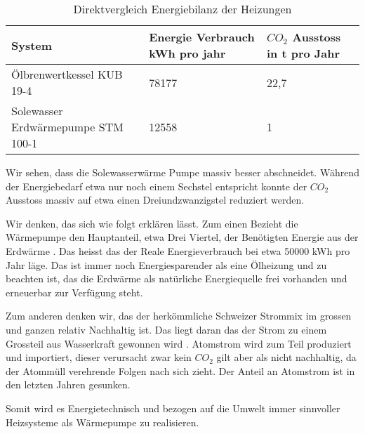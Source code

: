 \begin{table}
\begin{center}
\begin{tabular}{|l|l|l|}

\hline
  System   & Energie Verbrauch kWh pro jahr & $CO_2$ Ausstoss in t pro Jahr\\
\hline
 Ölbrenwertkessel KUB 19-4           & 78177 & 22,7 \\
\hline
 Solewasser Erdwärmepumpe STM 100-1  & 12558 & 1     \\
\hline
\end{tabular}
\end{center}
\label{bilanz:vergleich}
\caption{Direktvergleich Energiebilanz der Heizungen}
\end{table}

Wir sehen, dass die Solewasserwärme Pumpe massiv besser abschneidet.
Während der Energiebedarf etwa nur noch einem Sechstel entspricht konnte
der $CO_2$ Ausstoss massiv auf etwa einen Dreiundzwanzigstel reduziert werden.

Wir denken, das sich wie folgt erklären lässt.
Zum einen Bezieht die Wärmepumpe den Hauptanteil, etwa Drei Viertel, der Benötigten Energie
aus der Erdwärme \cite{junkers:funktionwarmepumpe}.
Das heisst das der Reale Energieverbrauch bei etwa 50000 kWh
pro Jahr läge. Das ist immer noch Energiesparender als eine Ölheizung und
zu beachten ist, das die Erdwärme als natürliche Energiequelle frei vorhanden
und erneuerbar zur Verfügung steht.

Zum anderen denken wir, das der herkömmliche Schweizer Strommix im grossen und
ganzen relativ Nachhaltig ist. Das liegt daran das der Strom zu einem Grossteil
aus Wasserkraft gewonnen wird \cite{bafu:strommix}.
Atomstrom wird zum Teil produziert und importiert, dieser verursacht zwar kein
$CO_2$ gilt aber als nicht nachhaltig, da der Atommüll verehrende Folgen
nach sich zieht.
Der Anteil an Atomstrom ist in den letzten Jahren gesunken.

Somit wird es Energietechnisch und bezogen auf die Umwelt immer sinnvoller
Heizsysteme als Wärmepumpe zu realisieren.
